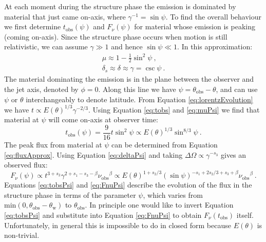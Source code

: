 \documentclass[twocolumn]{aastex62}
\newcommand{\tobs}{\ensuremath{t_{\mathrm{obs}}}}
\newcommand{\nuobs}{\ensuremath{\nu_{\mathrm{obs}}}}
\newcommand{\thobs}{\ensuremath{\theta_{\mathrm{obs}}}}
\newcommand{\thW}{\ensuremath{\theta_{\mathrm{w}}}}
\begin{document}
At each moment during the structure phase the emission is dominated by material that just came on-axis, where $\gamma^{-1} = \sin \psi$.  To find the overall behaviour we first determine $\tobs(\psi)$ and $F_\nu(\psi)$ for material whose emission is peaking (coming on-axis).  Since the structure phase occurs when motion is still relativistic, we can assume $\gamma \gg 1$ and hence $\sin \psi \ll 1$.  In this approximation:
\begin{eqnarray}
	\mu \approx 1 - \frac{1}{2}\sin^2\psi \ , \label{eq:muPsi}\\
	\delta_s \approx \delta \approx \gamma = \csc \psi\ . \label{eq:deltaPsi}
\end{eqnarray}
The material dominating the emission is in the plane between the observer and the jet axis, denoted by $\phi = 0$. Along this line we have $\psi = \thobs - \theta$, and can use $\psi$ or $\theta$ interchangeably to denote latitude.  From Equation \eqref{eq:lorentzEvolution} we have $t\propto E(\theta)^{1/3} \gamma^{-2/3}$.  Using Equation \eqref{eq:tobs} and \eqref{eq:muPsi} we find that material at $\psi$ will come on-axis at observer time:
\begin{equation}
	\tobs(\psi) = \frac{9}{16} t \sin^2\psi  \propto E(\theta)^{1/3} \sin^{8/3} \psi\ . \label{eq:tobsPsi}
\end{equation}
The peak flux from material at $\psi$ can be determined from Equation \eqref{eq:fluxApprox}.  Using Equation \eqref{eq:deltaPsi} and taking $\Delta \Omega \propto \gamma^{-s_3}$ gives an observed flux:
\begin{equation}
	F_\nu(\psi) \propto t^{3+s_2} \gamma^{2+s_1-s_3-\beta} \nuobs^\beta \propto E(\theta)^{1+s_2/3} (\sin \psi)^{-s_1 + 2 s_2/3 +s_3+\beta} \nuobs^\beta  \ . \label{eq:FnuPsi}
\end{equation}
	Equations \eqref{eq:tobsPsi} and \eqref{eq:FnuPsi} describe the evolution of the flux in the structure phase in terms of the parameter $\psi$, which varies from $\mathrm{min} (0, \thobs-\thW)$ to $\thobs$.  In principle one would like to invert Equation \eqref{eq:tobsPsi} and substitute into Equation \eqref{eq:FnuPsi} to obtain $F_\nu(\tobs)$ itself.  Unfortunately, in general this is impossible to do in closed form because $E(\theta)$ is non-trivial. 
	
\end{document}

